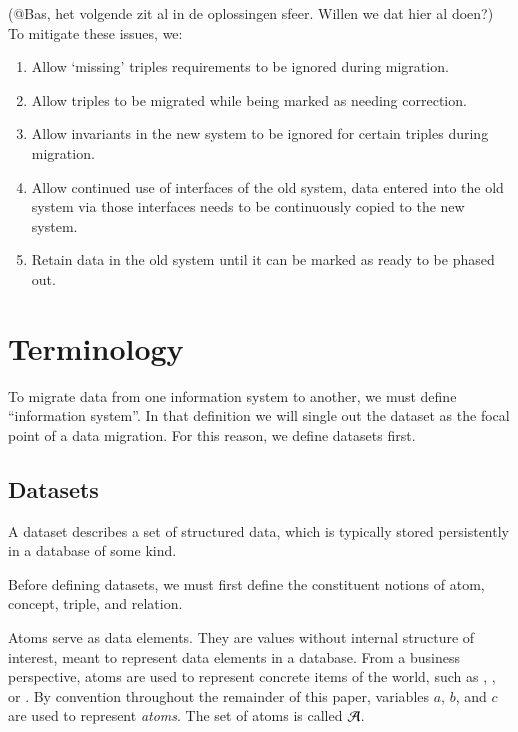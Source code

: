\documentclass{elsarticle}
\begin{document}
(@Bas, het volgende zit al in de oplossingen sfeer. Willen we dat hier al doen?)
	To mitigate these issues, we:
	
	\begin{enumerate}
	\item Allow `missing' triples requirements to be ignored during migration.
	\item Allow triples to be migrated while being marked as needing correction.
	\item Allow invariants in the new system to be ignored for certain triples during migration.
	\item Allow continued use of interfaces of the old system, data entered into the old system via those interfaces needs to be continuously copied to the new system.
	\item Retain data in the old system until it can be marked as ready to be phased out.
	\end{enumerate}	

\section{Terminology}
\label{sct:Terminology}
	To migrate data from one information system to another,
	we must define ``information system''.
	In that definition we will single out the dataset as the focal point of a data migration.
	For this reason, we define datasets first.

\subsection{Datasets}
	A dataset describes a set of structured data, which is typically stored persistently in a database of some kind.

	Before defining datasets, we must first define the constituent notions of atom, concept, triple, and relation.
	
	Atoms serve as data elements.
	They are values without internal structure of interest, meant to represent data elements in a database.
	From a business perspective, atoms are used to represent concrete items of the world,
	such as , , or .
	By convention throughout the remainder of this paper, variables $a$, $b$, and $c$ are used to represent \emph{atoms}.
	The set of atoms is called $\mathcal{A}$.
	
\end{document}
